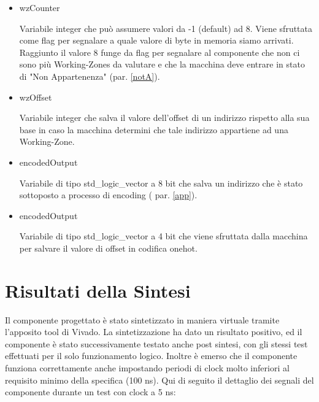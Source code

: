 \documentclass{article}
\newenvironment{gitFont}{\fontfamily{zi4}\selectfont}{\par}
\begin{document}
\begin{flushleft}
\begin{itemize}
\item \begin{gitFont}
wzCounter
\end{gitFont} Variabile integer che  può assumere valori da -1 (default) ad 8. Viene sfruttata come flag per segnalare a quale valore di byte in memoria siamo arrivati. Raggiunto il valore 8 funge da flag per segnalare al componente che non ci sono più Working-Zones da valutare e che la macchina deve entrare in stato di "Non Appartenenza" (par. \ref{notA}).

\item \begin{gitFont}
wzOffset
\end{gitFont} Variabile integer che salva il valore dell'offset di un indirizzo rispetto alla sua base in caso la macchina determini che tale indirizzo appartiene ad una Working-Zone.

\item \begin{gitFont}
encodedOutput
\end{gitFont} Variabile di tipo std{\_}logic{\_}vector a 8 bit che salva un indirizzo che è stato sottoposto a processo di encoding ( par. \ref{app}).

\item \begin{gitFont}
encodedOutput
\end{gitFont} Variabile di tipo std{\_}logic{\_}vector a 4 bit che viene sfruttata dalla macchina per salvare il valore di offset in codifica onehot.

\end{itemize}

\end{flushleft}
\section{Risultati della Sintesi}
Il componente progettato è stato sintetizzato in maniera virtuale tramite l'apposito tool di Vivado. La sintetizzazione ha dato un risultato positivo, ed il componente è stato successivamente testato anche post sintesi, con gli stessi test effettuati per il solo funzionamento logico. Inoltre è emerso che il componente funziona correttamente anche impostando periodi di clock molto inferiori al requisito minimo della specifica (100 ns). Qui di seguito il dettaglio dei segnali del componente durante un test con clock a 5 ns:

\end{document}
